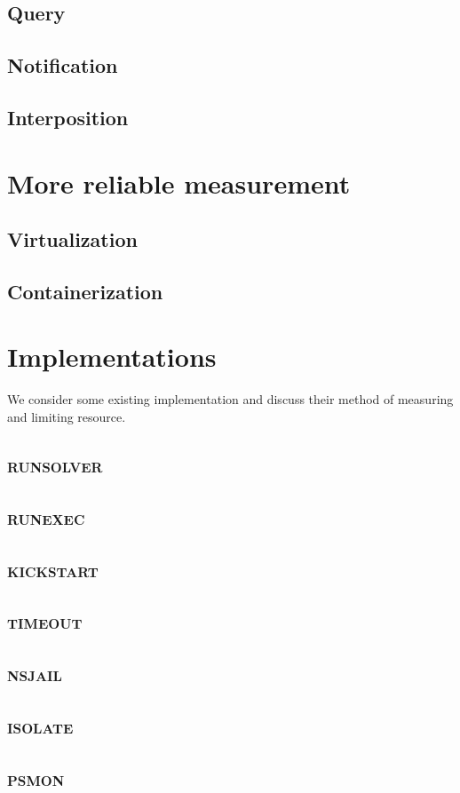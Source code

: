 \subsection{Query}
\subsection{Notification}
\subsection{Interposition}


\section{More reliable measurement}

\subsection{Virtualization}

\subsection{Containerization}


\section{Implementations}

We consider some existing implementation and discuss their method of measuring and limiting resource.

\subsection{\textsc{runsolver}}
\subsection{\textsc{runexec}}
\subsection{\textsc{kickstart}}
\subsection{\textsc{timeout}}
\subsection{\textsc{nsjail}}
\subsection{\textsc{isolate}}
\subsection{\textsc{psmon}}